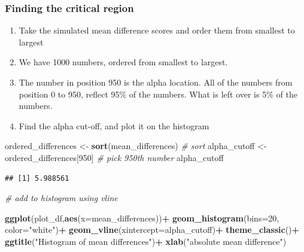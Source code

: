 \documentclass[]{book}
\newenvironment{Shaded}{\begin{snugshade}}{\end{snugshade}}
\newcommand{\KeywordTok}[1]{\textcolor[rgb]{0.13,0.29,0.53}{\textbf{#1}}}
\newcommand{\DataTypeTok}[1]{\textcolor[rgb]{0.13,0.29,0.53}{#1}}
\newcommand{\DecValTok}[1]{\textcolor[rgb]{0.00,0.00,0.81}{#1}}
\newcommand{\StringTok}[1]{\textcolor[rgb]{0.31,0.60,0.02}{#1}}
\newcommand{\CommentTok}[1]{\textcolor[rgb]{0.56,0.35,0.01}{\textit{#1}}}
\newcommand{\OperatorTok}[1]{\textcolor[rgb]{0.81,0.36,0.00}{\textbf{#1}}}
\newcommand{\NormalTok}[1]{#1}
\providecommand{\tightlist}{%
  \setlength{\itemsep}{0pt}\setlength{\parskip}{0pt}}
\begin{document}
\subsubsection{Finding the critical
region}\label{finding-the-critical-region}

\begin{enumerate}
\def\labelenumi{\arabic{enumi}.}
\tightlist
\item
  Take the simulated mean difference scores and order them from smallest
  to largest
\item
  We have 1000 numbers, ordered from smallest to largest.
\item
  The number in position 950 is the alpha location. All of the numbers
  from position 0 to 950, reflect 95\% of the numbers. What is left over
  is 5\% of the numbers.
\item
  Find the alpha cut-off, and plot it on the histogram
\end{enumerate}

\begin{Shaded}
\begin{Highlighting}[]
\NormalTok{ordered_differences <-}\StringTok{ }\KeywordTok{sort}\NormalTok{(mean_differences) }\CommentTok{# sort}
\NormalTok{alpha_cutoff <-}\StringTok{ }\NormalTok{ordered_differences[}\DecValTok{950}\NormalTok{] }\CommentTok{# pick 950th number}
\NormalTok{alpha_cutoff}
\end{Highlighting}
\end{Shaded}

\begin{verbatim}
## [1] 5.988561
\end{verbatim}

\begin{Shaded}
\begin{Highlighting}[]
\CommentTok{# add to histogram using vline}

\KeywordTok{ggplot}\NormalTok{(plot_df,}\KeywordTok{aes}\NormalTok{(}\DataTypeTok{x=}\NormalTok{mean_differences))}\OperatorTok{+}
\StringTok{  }\KeywordTok{geom_histogram}\NormalTok{(}\DataTypeTok{bins=}\DecValTok{20}\NormalTok{, }\DataTypeTok{color=}\StringTok{"white"}\NormalTok{)}\OperatorTok{+}
\StringTok{  }\KeywordTok{geom_vline}\NormalTok{(}\DataTypeTok{xintercept=}\NormalTok{alpha_cutoff)}\OperatorTok{+}
\StringTok{  }\KeywordTok{theme_classic}\NormalTok{()}\OperatorTok{+}
\StringTok{  }\KeywordTok{ggtitle}\NormalTok{(}\StringTok{"Histogram of mean differences"}\NormalTok{)}\OperatorTok{+}
\StringTok{  }\KeywordTok{xlab}\NormalTok{(}\StringTok{"absolute mean difference"}\NormalTok{)}
\end{Highlighting}
\end{Shaded}
\end{document}
